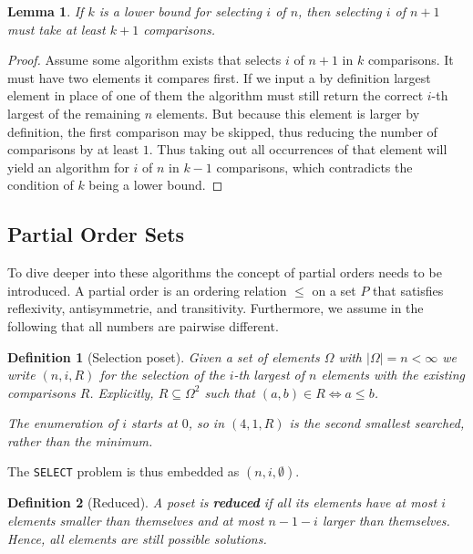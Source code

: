 \documentclass[10pt,journal,compsoc]{IEEEtran}
\newtheorem{lemma}{Lemma}
\newtheorem{definition}{Definition}
\begin{document}
\begin{lemma} \label{lemma:previous_next_poset}
  If $k$ is a lower bound for selecting $i$ of $n$, then selecting $i$ of $n + 1$ must take at least $k + 1$ comparisons.
\end{lemma}

\begin{proof}
  Assume some algorithm exists that selects $i$ of $n + 1$ in $k$ comparisons.
  It must have two elements it compares first.
  If we input a by definition largest element in place of one of them the algorithm must still return the correct $i$-th largest of the remaining $n$ elements.
  But because this element is larger by definition, the first comparison may be skipped, thus reducing the number of comparisons by at least $1$.
  Thus taking out all occurrences of that element will yield an algorithm for $i$ of $n$ in $k - 1$ comparisons, which contradicts the condition of $k$ being a lower bound.
\end{proof}

\subsection{Partial Order Sets}
To dive deeper into these algorithms the concept of partial orders needs to be introduced.
A partial order is an ordering relation $\leq$ on a set $P$ that satisfies reflexivity, antisymmetrie, and transitivity.
Furthermore, we assume in the following that all numbers are pairwise different.

\begin{definition}[Selection poset]
  Given a set of elements $\Omega$ with $|\Omega| = n < \infty$ we write $(n, i, R)$ for the selection of the $i$-th largest of $n$ elements with the existing comparisons $R$.
  Explicitly, $R\subseteq\Omega^2$ such that $(a, b)\in R \Longleftrightarrow a \leq b$.

  The enumeration of $i$ starts at $0$, so in $(4, 1, R)$ is the second smallest searched, rather than the minimum.
\end{definition}

The \texttt{SELECT} problem is thus embedded as $(n, i, \emptyset)$.

\begin{definition}[Reduced] \label{definition:reduced_poset}
  A poset is \textbf{reduced} if all its elements have at most $i$ elements smaller than themselves and at most $n - 1 - i$ larger than themselves.
  Hence, all elements are still possible solutions.
\end{definition}
\end{document}
